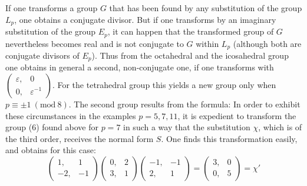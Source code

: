 If one transforms a group $G$ that has been found by any substitution of the group $L_p$, one obtains a conjugate divisor. But if one transforms by an imaginary substitution of the group $E_p$, it can happen that the transformed group of $G$ nevertheless becomes real and is not conjugate to $G$ within $L_p$ (although both are conjugate divisors of $E_p$). Thus from the octahedral and the icosahedral group one obtains in general a second, non-conjugate one, if one transforms
with $\begin{pmatrix} \varepsilon, & 0 \\ 0, & \varepsilon^{-1} \end{pmatrix}$. For the tetrahedral group this yields a new group only when $p\equiv\pm 1\ (\mathrm{mod}\ 8)$. The second group results from the formula:
In order to exhibit these circumstances in the examples $p=5,7,11$, it is expedient to transform the group (6) found above for $p=7$ in such a way that the substitution $\chi$, which is of the third order, receives the normal form $S$. One finds this transformation easily, and obtains for this case:
\[
\begin{pmatrix} 1, & 1 \\ -2, & -1 \end{pmatrix}
\begin{pmatrix} 0, & 2 \\ 3, & 1 \end{pmatrix}
\begin{pmatrix} -1, & -1 \\ 2, & 1 \end{pmatrix}
=
\begin{pmatrix} 3, & 0 \\ 0, & 5 \end{pmatrix}
= \chi'
\]
